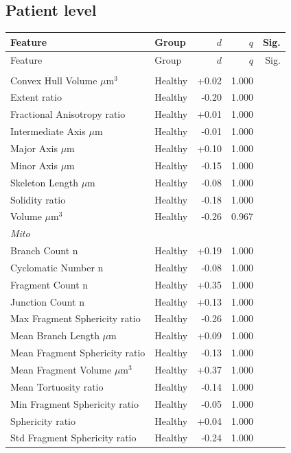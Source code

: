 \documentclass[11pt,a4paper]{article}
\begin{document}
\subsection*{Patient level}
\begin{longtable}{llrrr}
\toprule
Feature & Group & $d$ & $q$ & Sig. \\
\midrule\endfirsthead
\toprule Feature & Group & $d$ & $q$ & Sig. \\\midrule\endhead
\bottomrule\endfoot
\multicolumn{5}{l}{\textit{Actin}} \\
  Convex Hull Volume $\mu$m$^{3}$ & Healthy & +0.02 & 1.000 &  \\
  Extent ratio & Healthy & -0.20 & 1.000 &  \\
  Fractional Anisotropy ratio & Healthy & +0.01 & 1.000 &  \\
  Intermediate Axis $\mu$m & Healthy & -0.01 & 1.000 &  \\
  Major Axis $\mu$m & Healthy & +0.10 & 1.000 &  \\
  Minor Axis $\mu$m & Healthy & -0.15 & 1.000 &  \\
  Skeleton Length $\mu$m & Healthy & -0.08 & 1.000 &  \\
  Solidity ratio & Healthy & -0.18 & 1.000 &  \\
  Volume $\mu$m$^{3}$ & Healthy & -0.26 & 0.967 &  \\
\midrule
\multicolumn{5}{l}{\textit{Mito}} \\
  Branch Count n & Healthy & +0.19 & 1.000 &  \\
  Cyclomatic Number n & Healthy & -0.08 & 1.000 &  \\
  Fragment Count n & Healthy & +0.35 & 1.000 &  \\
  Junction Count n & Healthy & +0.13 & 1.000 &  \\
  Max Fragment Sphericity ratio & Healthy & -0.26 & 1.000 &  \\
  Mean Branch Length $\mu$m & Healthy & +0.09 & 1.000 &  \\
  Mean Fragment Sphericity ratio & Healthy & -0.13 & 1.000 &  \\
  Mean Fragment Volume $\mu$m$^{3}$ & Healthy & +0.37 & 1.000 &  \\
  Mean Tortuosity ratio & Healthy & -0.14 & 1.000 &  \\
  Min Fragment Sphericity ratio & Healthy & -0.05 & 1.000 &  \\
  Sphericity ratio & Healthy & +0.04 & 1.000 &  \\
  Std Fragment Sphericity ratio & Healthy & -0.24 & 1.000 &  \\

\end{longtable}
\end{document}
